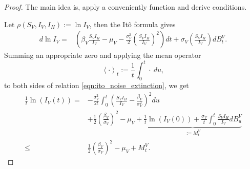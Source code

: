 \begin{proof}
    The main idea is, apply a conveniently function and derive conditions. 
    
    Let $\rho (S_V, I_V, I_H):= \ln I_V$, then the It\^{o} formula 
    gives
    \begin{equation} \label{eqn:ito_noise_extinction}
        \begin{aligned}
            d \ln I_V = & 
                \left(
                    \beta_V
                    \frac{S_V I_H}{ I_V} - \mu_V
                    - \frac{\sigma_V ^ 2}{2}
                    \left(
                        \frac{ S_V I_H}{I_V}
                    \right) ^ 2
                \right) dt
                 + \sigma_V 
                \left(
                    \frac{S_V I_H}{ I_V}
                \right) dB_t ^ V.
        \end{aligned}
    \end{equation}
    Summing an appropriate zero and applying the mean operator
    $$
        \left < \cdot \right >_t
        := 
            \frac{1}{t}
            \int_{0} ^ t
                \cdot \ du,
    $$
    to both sides of relation \eqref{eqn:ito_noise_extinction}, we get
    \begin{equation} \label{eqn:applying_mean_opeartor}
        \begin{aligned}
            \frac{1}{t} \ln(I_V(t))
            =&
            - 
            \frac{\sigma_V ^ 2}{2t}
            \int_{0} ^ {t}
                \left(
                    \frac{S_V I_H}{I_V} 
                    -
                    \frac{\beta_V}{\sigma_V ^ 2}
                \right)^2
            du
            \\
            & 
            + 
            \frac{1}{2}
            \left(
                \frac{\beta_V}{\sigma_V}
            \right) ^ 2
            -
            \mu_V 
            + 
            \underbrace{
                \frac{1}{t} \ln(I_V(0))
                +
                \frac{\sigma_V}{t}
                \int_{0}^t
                    \frac{S_V I_H}{I_V}
                    dB_u^V
            }_{:=M_t ^ V}
            \\
            \leq
                &
            \frac{1}{2}
            \left(
                \frac{\beta_V}{\sigma_V}
            \right) ^ 2
            -
            \mu_V 
            + 
            M_t ^ V.
        \end{aligned}

\end{equation}
\end{proof}
